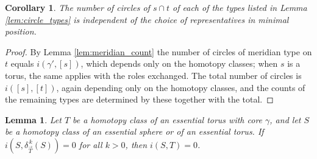 \documentclass[12pt,a4paper]{amsart}
\numberwithin{equation}{section}
\theoremstyle{plain}
\newtheorem{lemma}[theorem]{Lemma}
\newtheorem{corollary}[theorem]{Corollary}
\theoremstyle{definition}
\theoremstyle{remark}
\begin{document}
\begin{corollary} \label{cor:type_invariance}
    The number of circles of $s \cap t$ of each of the types listed in Lemma \ref{lem:circle_types} is independent of the choice of representatives in minimal position.
\end{corollary}

\begin{proof}
    By Lemma \ref{lem:meridian_count} the number of circles of meridian type on $t$ equals $i(\gamma', [s])$, which depends only on the homotopy classes; when $s$ is a torus, the same applies with the roles exchanged.
    The total number of circles is $i([s],[t])$, again depending only on the homotopy classes, and the counts of the remaining types are determined by these together with the total.
\end{proof}

\begin{lemma} \label{lem:dehn_disj}
    Let $T$ be a homotopy class of an essential torus with core $\gamma$, and let $S$ be a homotopy class of an essential sphere or of an essential torus.
    If $i(S, \delta_{\vec T}^{\,k}(S)) = 0$ for all $k > 0$, then $i(S, T) = 0$.
\end{lemma}
\end{document}
